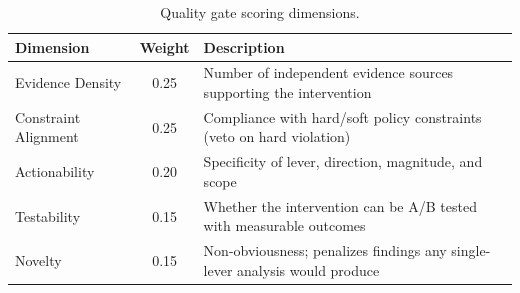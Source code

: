 \begin{table}[ht]
\centering
\caption{Quality gate scoring dimensions.}
\label{tab:quality}
\small
\begin{tabular}{lcp{6cm}}
\toprule
\textbf{Dimension} & \textbf{Weight} & \textbf{Description} \\
\midrule
Evidence Density & 0.25 & Number of independent evidence sources supporting the intervention \\
Constraint Alignment & 0.25 & Compliance with hard/soft policy constraints (veto on hard violation) \\
Actionability & 0.20 & Specificity of lever, direction, magnitude, and scope \\
Testability & 0.15 & Whether the intervention can be A/B tested with measurable outcomes \\
Novelty & 0.15 & Non-obviousness; penalizes findings any single-lever analysis would produce \\
\bottomrule
\end{tabular}
\end{table}